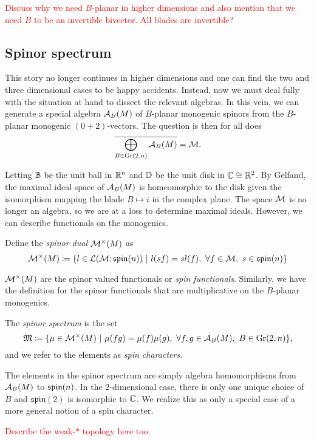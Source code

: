 \textcolor{red}{Discuss why we need $B$-planar in higher dimensions and also mention that we need $B$ to be an invertible bivector. All blades are invertible?}



\subsection{Spinor spectrum}

This story no longer continues in higher dimensions and one can find the two and three dimensional cases to be happy accidents.  Instead, now we must deal fully with the situation at hand to dissect the relevant algebras. In this vein, we can generate a special algebra $\mathcal{A}_{B}(M)$ of $B$-planar monogenic spinors from the $B$-planar monogenic $(0+2)$-vectors.  The question is then for all does
\[
\overline{\bigoplus_{B \in \operatorname{Gr}(2,n)} \mathcal{A}_{B}(M) } = \mathcal{M}.
\]

Letting $\mathbb{B}$ be the unit ball in $\mathbb{R}^n$ and $\mathbb{D}$ be the unit disk in $\mathbb{C} \cong \mathbb{R}^2$.  By Gelfand, the maximal ideal space of $\mathcal{A}_{B}(M)$ is homeomorphic to the disk given the isomorphism mapping the blade $B \mapsto i$ in the complex plane.  The space $\mathcal{M}$ is no longer an algebra, so we are at a loss to determine maximal ideals.  However, we can describe functionals on the monogenics.

\begin{definition}
    Define the \emph{spinor dual} $\mathcal{M}^\times(M)$ as
    \[
        \mathcal{M}^\times(M) \coloneqq \{ l \in \mathcal{L}(\mathcal{M}; \mathfrak{spin}(n)) ~\vert~ l(sf) = sl(f), ~\forall f \in \mathcal{M}, ~s \in \mathfrak{spin}(n) \}
    \]
\end{definition}
$\mathcal{M}^\times(M)$ are the spinor valued functionals or \emph{spin functionals}. Similarly, we have the definition for the spinor functionals that are multiplicative on the $B$-planar monogenics.
\begin{definition}
    The \emph{spinor spectrum} is the set
    \[
        \mathfrak{M} \coloneqq \{ \mu \in \mathcal{M}^\times(M) ~\vert~ \mu(fg) = \mu(f)\mu(g),~ \forall f,g \in \mathcal{A}_{B}(M), ~ B \in \operatorname{Gr}(2,n)\},
    \]
    and we refer to the elements as \emph{spin characters}.
\end{definition}
The elements in the spinor spectrum are simply algebra homomorphisms from $\mathcal{A}_{B}(M)$ to $\mathfrak{spin}(n)$. In the 2-dimensional case, there is only one unique choice of $B$ and $\mathfrak{spin}(2)$ is isomorphic to $\mathbb{C}$.  We realize this as only a special case of a more general notion of a spin character.

\textcolor{red}{Describe the weak-$\ast$ topology here too.} 

